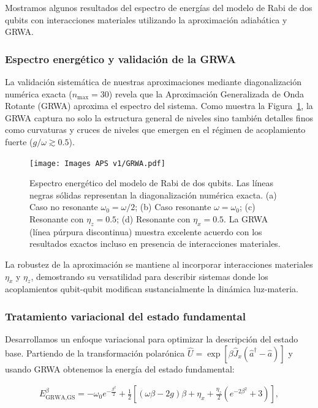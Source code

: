 \documentclass[onecolumn,notitlepage,letterpaper,aps,pra,12pt]{article}
\numberwithin{equation}{section}
\begin{document}
Mostramos algunos resultados del espectro de energías del modelo de Rabi de dos qubits con interacciones materiales utilizando la aproximación adiabática y GRWA. 

\subsubsection{Espectro energético y validación de la GRWA}

La validación sistemática de nuestras aproximaciones mediante diagonalización numérica exacta ($n_{\text{max}}=30$) revela que la Aproximación Generalizada de Onda Rotante (GRWA) aproxima el espectro del sistema. Como muestra la Figura~\ref{fig: Conventional GRWA}, la GRWA captura no solo la estructura general de niveles sino también detalles finos como curvaturas y cruces de niveles que emergen en el régimen de acoplamiento fuerte ($g/\omega \gtrsim 0.5$).

\begin{figure}[H]
    \centering
    \texttt{[image: Images APS v1/GRWA.pdf]}
    \caption{Espectro energético del modelo de Rabi de dos qubits. Las líneas negras sólidas representan la diagonalización numérica exacta. (a) Caso no resonante $\omega_0 = \omega/2$; (b) Caso resonante $\omega = \omega_0$; (c) Resonante con $\eta_z = 0.5$; (d) Resonante con $\eta_x = 0.5$. La GRWA (línea púrpura discontinua) muestra excelente acuerdo con los resultados exactos incluso en presencia de interacciones materiales.}
    \label{fig: Conventional GRWA}
\end{figure}

La robustez de la aproximación se mantiene al incorporar interacciones materiales $\eta_x$ y $\eta_z$, demostrando su versatilidad para describir sistemas donde los acoplamientos qubit-qubit modifican sustancialmente la dinámica luz-materia.

\subsubsection{Tratamiento variacional del estado fundamental}

Desarrollamos un enfoque variacional para optimizar la descripción del estado base. Partiendo de la transformación polarónica $\hat{U} = \exp\left[ \beta\hat{J}_{x}(\hat{a}^{\dagger} - \hat{a}) \right]$ y usando GRWA obtenemos la energía del estado fundamental:

\begin{gather}
E_{\text{GRWA,GS}}^{\beta} = -\omega_{0} e^{-\frac{\beta^{2}}{2}} + \frac{1}{2}\left[ (\omega \beta -2g)\beta + \eta_{x} + \frac{\eta_{z}}{2}\left(e^{-2\beta^{2}}+3 \right) \right],
\end{gather}
\end{document}
